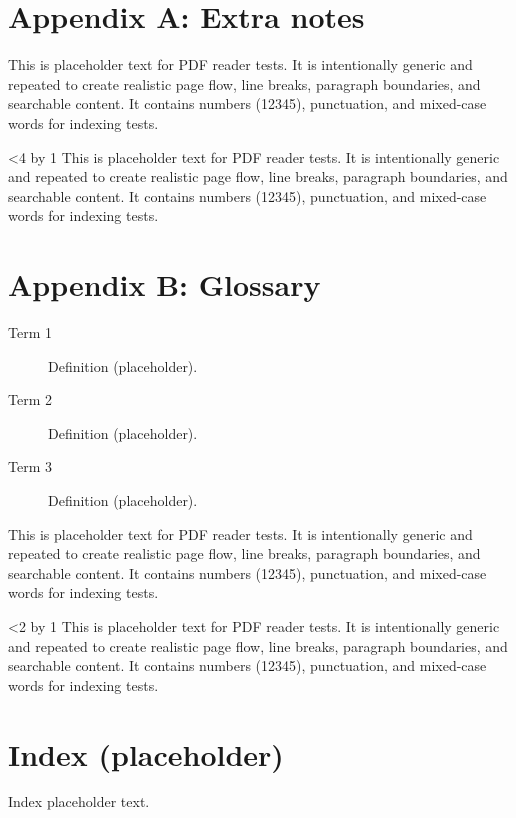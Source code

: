\documentclass[a4paper,11pt,openany]{book}
\makeatletter
\renewcommand\backmatter{%
  \if@openright\cleardoublepage\else\clearpage\fi
  \@mainmatterfalse
  \renewcommand\thepage{\arabic{page}}%
}
\newcommand{\filler}{%
This is placeholder text for PDF reader tests. It is intentionally generic and repeated to
create realistic page flow, line breaks, paragraph boundaries, and searchable content.
It contains numbers (12345), punctuation, and mixed-case words for indexing tests. \par\medskip
}
\newcommand{\manyfiller}[1]{%
\begingroup
\fillercount=0
\loop\ifnum\fillercount<#1
  \advance\fillercount by 1
  \filler
\repeat
\endgroup
}
\makeatother
\begin{document}
\backmatter

\chapter*{Appendix A: Extra notes}
\filler\manyfiller{4}

\chapter*{Appendix B: Glossary}
\begin{description}
  \item[Term 1] Definition (placeholder).
  \item[Term 2] Definition (placeholder).
  \item[Term 3] Definition (placeholder).
\end{description}
\filler\manyfiller{2}

\chapter*{Index (placeholder)}
Index placeholder text.
\end{document}
